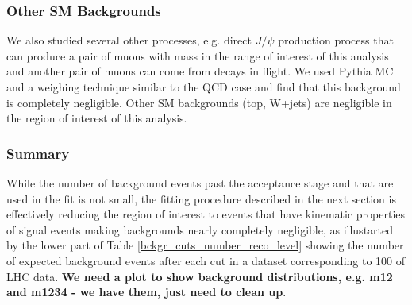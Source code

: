 \documentclass[aps,12pt,superscriptaddress,nofootinbib,floatfix,showpacs]{revtex4}
\begin{document}
\subsubsection{Other SM Backgrounds}

We also studied several other processes, e.g. direct $J/\psi$ production process that
can produce  a pair of muons with mass in the range of interest of this analysis and
another pair of muons can  come from decays in flight. We used Pythia MC and a
weighing technique similar to the QCD case and  find that this background is
completely negligible. Other SM backgrounds (top, W+jets) are negligible  in the
region of interest of this analysis.

\subsubsection{Summary}

While the number of background events past the acceptance stage and that are used in
the fit is not small,  the fitting procedure described in the next section is
effectively reducing the region of interest to  events that have kinematic properties
of signal events making backgrounds nearly completely negligible, as  illustarted by
the lower part of Table \ref{bckgr_cuts_number_reco_level} showing the number of
expected  background events after each cut in a dataset corresponding to 100 \ipb of
LHC data. {\bf We need a plot  to show background distributions, e.g. m12 and m1234 -
we have them, just need to clean up}.
\end{document}
